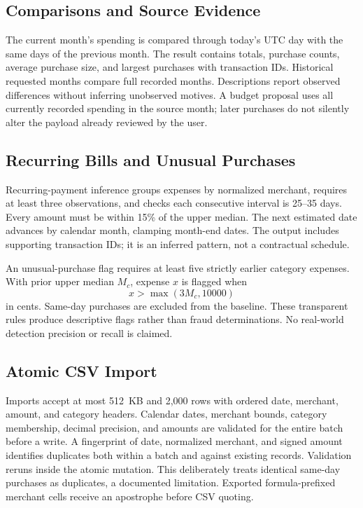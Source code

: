 \documentclass[conference,a4paper]{IEEEtran}
\begin{document}
\subsection{Comparisons and Source Evidence}
The current month's spending is compared through today's UTC day with the same days of the previous month. The result contains totals, purchase counts, average purchase size, and largest purchases with transaction IDs. Historical requested months compare full recorded months. Descriptions report observed differences without inferring unobserved motives. A budget proposal uses all currently recorded spending in the source month; later purchases do not silently alter the payload already reviewed by the user.

\subsection{Recurring Bills and Unusual Purchases}
Recurring-payment inference groups expenses by normalized merchant, requires at least three observations, and checks each consecutive interval is 25--35 days. Every amount must be within 15\% of the upper median. The next estimated date advances by calendar month, clamping month-end dates. The output includes supporting transaction IDs; it is an inferred pattern, not a contractual schedule.

An unusual-purchase flag requires at least five strictly earlier category expenses. With prior upper median $M_c$, expense $x$ is flagged when
\begin{equation}
x>\max(3M_c,10000)
\end{equation}
in cents. Same-day purchases are excluded from the baseline. These transparent rules produce descriptive flags rather than fraud determinations. No real-world detection precision or recall is claimed.

\subsection{Atomic CSV Import}
Imports accept at most 512~KB and 2,000 rows with ordered date, merchant, amount, and category headers. Calendar dates, merchant bounds, category membership, decimal precision, and amounts are validated for the entire batch before a write. A fingerprint of date, normalized merchant, and signed amount identifies duplicates both within a batch and against existing records. Validation reruns inside the atomic mutation. This deliberately treats identical same-day purchases as duplicates, a documented limitation. Exported formula-prefixed merchant cells receive an apostrophe before CSV quoting.
\end{document}
